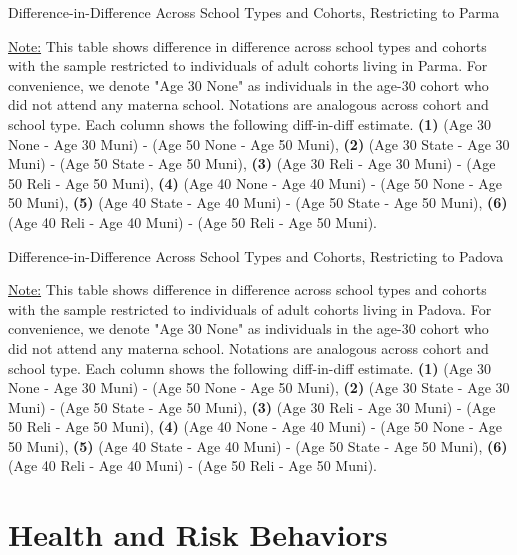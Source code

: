 \documentclass[11pt]{article}
\begin{document}
\begin{table}[H]
\begin{center}
	\caption{Difference-in-Difference Across School Types and Cohorts, Restricting to Parma}
	\scalebox{0.83}{
		}
\end{center}
\footnotesize
\underline{Note:} This table shows difference in difference across school types and cohorts with the sample restricted to individuals of adult cohorts living in Parma. For convenience, we denote "Age 30 None" as individuals in the age-30 cohort who did not attend any materna school. Notations are analogous across cohort and school type. Each column shows the following diff-in-diff estimate. \textbf{(1)} (Age 30 None - Age 30 Muni) - (Age 50 None - Age 50 Muni), \textbf{(2)} (Age 30 State - Age 30 Muni) - (Age 50 State - Age 50 Muni), \textbf{(3)} (Age 30 Reli - Age 30 Muni) - (Age 50 Reli - Age 50 Muni), \textbf{(4)} (Age 40 None - Age 40 Muni) - (Age 50 None - Age 50 Muni),  \textbf{(5)} (Age 40 State - Age 40 Muni) - (Age 50 State - Age 50 Muni), \textbf{(6)} (Age 40 Reli - Age 40 Muni) - (Age 50 Reli - Age 50 Muni). 
\end{table}

\begin{table}[H]
\begin{center}
	\caption{Difference-in-Difference Across School Types and Cohorts, Restricting to Padova}
	\scalebox{0.83}{
		}
\end{center}
\footnotesize
\underline{Note:} This table shows difference in difference across school types and cohorts with the sample restricted to individuals of adult cohorts living in Padova. For convenience, we denote "Age 30 None" as individuals in the age-30 cohort who did not attend any materna school. Notations are analogous across cohort and school type. Each column shows the following diff-in-diff estimate. \textbf{(1)} (Age 30 None - Age 30 Muni) - (Age 50 None - Age 50 Muni), \textbf{(2)} (Age 30 State - Age 30 Muni) - (Age 50 State - Age 50 Muni), \textbf{(3)} (Age 30 Reli - Age 30 Muni) - (Age 50 Reli - Age 50 Muni), \textbf{(4)} (Age 40 None - Age 40 Muni) - (Age 50 None - Age 50 Muni),  \textbf{(5)} (Age 40 State - Age 40 Muni) - (Age 50 State - Age 50 Muni), \textbf{(6)} (Age 40 Reli - Age 40 Muni) - (Age 50 Reli - Age 50 Muni). 
\end{table}




\section{Health and Risk Behaviors}
\end{document}
